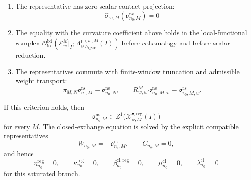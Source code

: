 \begin{prop}
\begin{enumerate}[label=(R\arabic*)]
\[      \]
      where all defect cotangent labels are smooth compactly supported
      densities \(b_{\Gamma,\ell,j}(t)dt\), all coefficient labels lie in
      degree \(\leq M\), and \(B^{\mathrm{reg}}_{n_0,M}\) is a
      regular-density local counterterm in the graph/counterterm complex.
    \item The representative has zero scalar-contact projection:
      \[
        \widehat\sigma_{\mathrm{sc},M}
        (\mathfrak o^{\mathrm{ns}}_{n_0,M})=0
      \]
    \item The equality with the curvature coefficient above holds in the
      local-functional complex
      \(\mathcal O_{\mathrm{loc}}^{\mathrm{bd}}
      (\mathcal E_w^M|_I;
      A_{\partial,\hbar_{\mathrm{QME}}}^{\mathrm{pp},w,M}(I))\) before cohomology and
      before scalar reduction.
    \item The representatives commute with finite-window truncation and
      admissible weight transport:
      \[
        \pi_{M,N}\mathfrak o^{\mathrm{ns}}_{n_0,M}
          =
        \mathfrak o^{\mathrm{ns}}_{n_0,N},
        \qquad
        R^M_{w,w'}\mathfrak o^{\mathrm{ns}}_{n_0,M,w}
          =
        \mathfrak o^{\mathrm{ns}}_{n_0,M,w'}
      \]
  \end{enumerate}

  If this criterion holds, then
  \[
    \mathfrak o^{\mathrm{ns}}_{n_0,M}
      \in
    Z^1\bigl(\mathcal X^{\bullet,\mathrm{reg}}_{w,M}(I)\bigr)
  \]
  for every \(M\).  The closed-exchange equation is solved by the explicit
  compatible representatives
  \[
    W_{n_0,M}=-\mathfrak o^{\mathrm{ns}}_{n_0,M},
    \qquad
    C_{n_0,M}=0,
  \]
  and hence
  \[
    \eta^{\mathrm{reg}}_{n_0}=0,\qquad
    \kappa^{\mathrm{reg}}_{n_0}=0,\qquad
    \beta^{\mathrm{cl},\mathrm{reg}}_{n_0}=0,\qquad
    \mu^{\mathrm{cl}}_{n_0}=0,\qquad
    \lambda^{\mathrm{cl}}_{n_0}=0
  \]
  for this saturated branch.


\end{prop}
